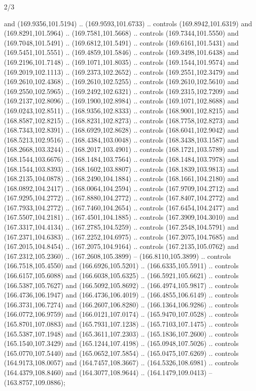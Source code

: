 \begin{flagdescription}{2/3}
\begin{scope}[shift={(0.5\flaglength,0.5)},scale=\flagwidth/320]
\begin{scope}[y=0.8pt, x=0.8pt, yscale=-1,shift={(-118.3,-146)}]
  and (169.9356,101.5194) .. (169.9593,101.6733) .. controls (169.8942,101.6319)
  and (169.8291,101.5964) .. (169.7581,101.5668) .. controls (169.7344,101.5550)
  and (169.7048,101.5491) .. (169.6812,101.5491) .. controls (169.6161,101.5431)
  and (169.5451,101.5551) .. (169.4859,101.5846) .. controls (169.3498,101.6438)
  and (169.2196,101.7148) .. (169.1071,101.8035) .. controls (169.1544,101.9574)
  and (169.2019,102.1113) .. (169.2373,102.2652) .. controls (169.2551,102.3479)
  and (169.2610,102.4368) .. (169.2610,102.5255) .. controls (169.2610,102.5610)
  and (169.2550,102.5965) .. (169.2492,102.6321) .. controls (169.2315,102.7209)
  and (169.2137,102.8096) .. (169.1900,102.8984) .. controls (169.1071,102.8688)
  and (169.0243,102.8511) .. (168.9356,102.8333) .. controls (168.9001,102.8215)
  and (168.8587,102.8215) .. (168.8231,102.8273) .. controls (168.7758,102.8273)
  and (168.7343,102.8391) .. (168.6929,102.8628) .. controls (168.6041,102.9042)
  and (168.5213,102.9516) .. (168.4384,103.0048) .. controls (168.3438,103.1587)
  and (168.2668,103.3244) .. (168.2017,103.4901) .. controls (168.1721,103.5789)
  and (168.1544,103.6676) .. (168.1484,103.7564) .. controls (168.1484,103.7978)
  and (168.1544,103.8393) .. (168.1602,103.8807) .. controls (168.1839,103.9813)
  and (168.2135,104.0878) .. (168.2490,104.1884) .. controls (168.1661,104.2180)
  and (168.0892,104.2417) .. (168.0064,104.2594) .. controls (167.9709,104.2712)
  and (167.9295,104.2772) .. (167.8880,104.2772) .. controls (167.8407,104.2772)
  and (167.7933,104.2772) .. (167.7460,104.2654) .. controls (167.6454,104.2477)
  and (167.5507,104.2181) .. (167.4501,104.1885) .. controls (167.3909,104.3010)
  and (167.3317,104.4134) .. (167.2785,104.5259) .. controls (167.2548,104.5791)
  and (167.2371,104.6383) .. (167.2252,104.6975) .. controls (167.2075,104.7685)
  and (167.2015,104.8454) .. (167.2075,104.9164) .. controls (167.2135,105.0762)
  and (167.2312,105.2360) .. (167.2608,105.3899) -- (166.8110,105.3899) ..
  controls (166.7518,105.4550) and (166.6926,105.5201) .. (166.6335,105.5911) ..
  controls (166.6157,105.6088) and (166.6038,105.6325) .. (166.5921,105.6621) ..
  controls (166.5387,105.7627) and (166.5092,105.8692) .. (166.4974,105.9817) ..
  controls (166.4736,106.1947) and (166.4736,106.4019) .. (166.4855,106.6149) ..
  controls (166.3731,106.7274) and (166.2607,106.8280) .. (166.1364,106.9286) ..
  controls (166.0772,106.9759) and (166.0121,107.0174) .. (165.9470,107.0528) ..
  controls (165.8701,107.0883) and (165.7931,107.1238) .. (165.7103,107.1475) ..
  controls (165.5387,107.1948) and (165.3611,107.2303) .. (165.1836,107.2600) ..
  controls (165.1540,107.3429) and (165.1244,107.4198) .. (165.0948,107.5026) ..
  controls (165.0770,107.5440) and (165.0652,107.5854) .. (165.0475,107.6269) ..
  controls (164.9173,108.0057) and (164.7457,108.3667) .. (164.5326,108.6981) ..
  controls (164.4379,108.8460) and (164.3077,108.9644) .. (164.1479,109.0413) --
  (163.8757,109.0886);


\end{scope}
\end{scope}
\end{flagdescription}
